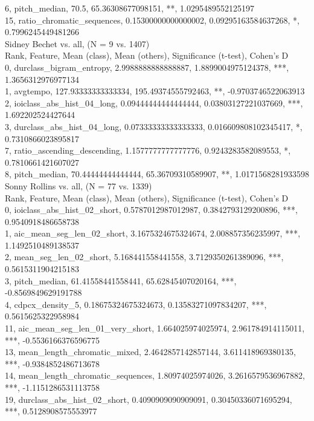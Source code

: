 6, pitch_median, 70.5, 65.36308677098151, **, 1.0295489552125197\\
15, ratio_chromatic_sequences, 0.15300000000000002, 0.09295163584637268, *, 0.7996245449481266\\
Sidney Bechet vs. all, (N = 9 vs. 1407)\\
Rank, Feature, Mean (class), Mean (others), Significance (t-test), Cohen's D\\
0, durclass_bigram_entropy, 2.9988888888888887, 1.8899004975124378, ***, 1.3656312976977134\\
1, avgtempo, 127.93333333333334, 195.49374555792463, **, -0.9703746522063913\\
2, ioiclass_abs_hist_04_long, 0.09444444444444444, 0.03803127221037669, ***, 1.692202524427644\\
3, durclass_abs_hist_04_long, 0.07333333333333333, 0.016609808102345417, *, 0.7310866023895817\\
7, ratio_ascending_descending, 1.1577777777777776, 0.9243283582089553, *, 0.7810661421607027\\
8, pitch_median, 70.44444444444444, 65.36709310589907, **, 1.0171568281933598\\
Sonny Rollins vs. all, (N = 77 vs. 1339)\\
Rank, Feature, Mean (class), Mean (others), Significance (t-test), Cohen's D\\
0, ioiclass_abs_hist_02_short, 0.5787012987012987, 0.3842793129200896, ***, 0.9540918486658738\\
1, aic_mean_seg_len_02_short, 3.1675324675324674, 2.008857356235997, ***, 1.1492510489138537\\
2, mean_seg_len_02_short, 5.168441558441558, 3.7129350261389096, ***, 0.5615311904215183\\
3, pitch_median, 61.41558441558441, 65.62845407020164, ***, -0.8569849629191788\\
4, cdpcx_density_5, 0.18675324675324673, 0.13583271097834207, ***, 0.5615625322958984\\
11, aic_mean_seg_len_01_very_short, 1.664025974025974, 2.961784914115011, ***, -0.5536166376596775\\
13, mean_length_chromatic_mixed, 2.4642857142857144, 3.611418969380135, ***, -0.9384852486713678\\
14, mean_length_chromatic_sequences, 1.80974025974026, 3.2616579536967882, ***, -1.1151286531113758\\
19, durclass_abs_hist_02_short, 0.4090909090909091, 0.30450336071695294, ***, 0.5128908575553977\\
